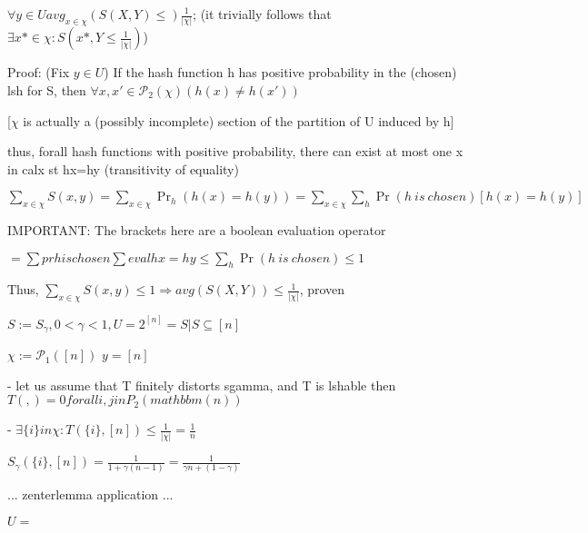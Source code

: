 	$\forall y \in U avg_{x \in \chi}(S(X, Y) \leq) \frac{1}{|\chi|}$; (it trivially follows that $\exists x* \in \chi : S(x*, Y \leq \frac{1}{|\chi|})$)
	
	Proof: (Fix $y \in U$) If the hash function h has positive probability in the (chosen) lsh for S, then $\forall {x, x'} \in \mathcal{P}_2(\chi) (h(x)\neq h(x'))$
	
	[$\chi$ is actually a (possibly incomplete) section of the partition of U induced by h]
	
	thus, forall hash functions with positive probability, there can exist at most one x in calx st hx=hy (transitivity of equality)
	
	$\sum_{x \in \chi}S(x, y) = \sum_{x \in \chi}\Pr_h(h(x)=h(y)) = \sum_{x \in \chi}\sum_{h}\Pr(h\ is\ chosen)[h(x)=h(y)]$
	
	IMPORTANT: The brackets here are a boolean evaluation operator
	
	$= \sum pr h is chosen \sum eval hx = hy \leq \sum_h \Pr(h\ is\ chosen) \leq 1$
	
	Thus, $\sum_{x \in \chi}S(x, y) \leq 1 \Rightarrow avg(S(X, Y)) \leq \frac{1}{|\chi|}$, proven
	
	
	
	
	$S:= S_\gamma , 0 < \gamma < 1, U=2^{[n]}={S|S\subseteq [n]}$ %
	
	$\chi := \mathcal{P}_1([n])$
	$y = [n]$
	
	 - let us assume that T finitely distorts sgamma, and T is lshable
	then $T({},{}) = 0 forall {i, j} in P_2(mathbbm(n))$
	
	 - $\exists \{i\} in \chi : T(\{i\}, [n]) \leq \frac{1}{|\chi|} = \frac{1}{n}$
	 
	 $S_\gamma(\{i\}, [n]) = \frac{1}{1 + \gamma(n-1)} = \frac{1}{\gamma n + (1-\gamma)}$
	 
	 ...
	 zenterlemma application
	 ...
	
	
	
	$ U = {}$